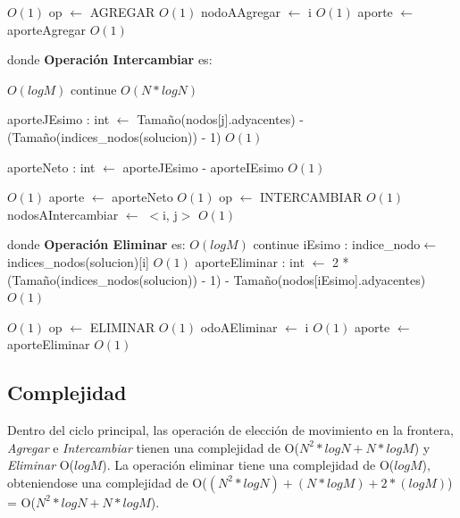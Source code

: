 \documentclass[a4paper, 10pt, twoside]{article}
\newenvironment{pseudo}[1][]{%
    \vspace{1em}%
    \begin{algorithmic}%
}
{%
    \end{algorithmic}%
    \vspace{1em}%
}
\newcommand{\Ode}[1]{\hfill $O(#1)$}
\begin{document}
\begin{pseudo}
																						\Ode{1}
					\State op $\leftarrow$ AGREGAR 																	\Ode{1}
					\State nodoAAgregar $\leftarrow$ i 																\Ode{1}
					\State aporte $\leftarrow$ aporteAgregar														\Ode{1}
				\EndIf
			\EndIf
		\EndFor

\State
\State donde \textbf{Operación Intercambiar} es:
\State

																					\Ode{log M}
					\State continue
				\EndIf
									\Ode{N*log N}

					\State aporteJEsimo : int $\leftarrow$ Tamaño(nodos[j].adyacentes) - 
					\State (Tamaño(indices\_nodos(solucion)) - 1)													\Ode{1}

					\State aporteNeto : int $\leftarrow$ aporteJEsimo - aporteIEsimo								\Ode{1}

																							\Ode{1}
						\State aporte $\leftarrow$ aporteNeto														\Ode{1}
						\State op $\leftarrow$ INTERCAMBIAR 														\Ode{1}
						\State nodosAIntercambiar $\leftarrow$ $<$i, j$>$ 											\Ode{1}
					\EndIf
				\EndIf
			\EndFor

\State
\State donde \textbf{Operación Eliminar} es:
\State
																					\Ode{log M}
				  \State continue
			\EndIf
			\State iEsimo : indice\_nodo$\leftarrow$ indices\_nodos(solucion)[i]									\Ode{1}
			\State aporteEliminar : int $\leftarrow$ 2 * (Tamaño(indices\_nodos(solucion)) - 1) -
			\State Tamaño(nodos[iEsimo].adyacentes)																	\Ode{1}

																						\Ode{1}
				\State op $\leftarrow$ ELIMINAR 																	\Ode{1}
				\State odoAEliminar $\leftarrow$ i 																	\Ode{1}
				\State aporte $\leftarrow$ aporteEliminar 															\Ode{1}
			\EndIf
		\EndFor

\State

\end{pseudo}

\subsection{Complejidad}
Dentro del ciclo principal, las operación de elección de movimiento en la frontera, \textit{Agregar} e \textit{Intercambiar} tienen una complejidad de O($N^2 * log N + N * log M$) y \textit{Eliminar} O($log M$). La operación eliminar tiene una complejidad de O($log M$), obteniendose una complejidad de O($(N^2 * log N) + (N * log M) + 2*(log  M)$) = O($N^2 * log N + N * log M$).
\end{document}
